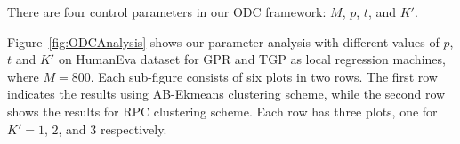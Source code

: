 There are four control parameters in our ODC framework: $M$, $p$, $t$, and $K'$. Figure~\ref{fig:ODCAnalysis}  shows our parameter analysis with different values of $p$, $t$ and $K'$ on HumanEva dataset  for GPR and TGP as local regression machines, where $M=800$.  Each sub-figure consists of six plots in two rows. The first row indicates the results using AB-Ekmeans clustering scheme, while the second row shows the results for RPC clustering scheme. Each row has three plots, one for $K'=1$, $2$, and $3$ respectively. 
\begin{comment}
\begin{figure}[h!]
\centering
\begin{tabular}{cc}
 {\footnotesize (a) GPR-ODC (M=800) } &
\bmvaHangBox{{{     \texttt{[image: figGPR800HEva.eps]}}}} \\
 { \footnotesize (b) TGP-ODC (M=800)}  &
\bmvaHangBox{{  \texttt{[image: figTGP800HEva.eps]}}}\\
\ignore{\bmvaHangBox{{  \texttt{[image: figTGP400HEva.eps]}}}\\
(c) TGP-ODC (M=400) \\}
\end{tabular}
\vspace{2mm}
\caption{Overlapping Domain Cover Parameter Analysis of GPR and TGP  on Human Eva Dataset (best seen in color)}
\label{fig:ODCAnalysis}
\vspace{-15mm}
\end{figure}
\end{comment}
